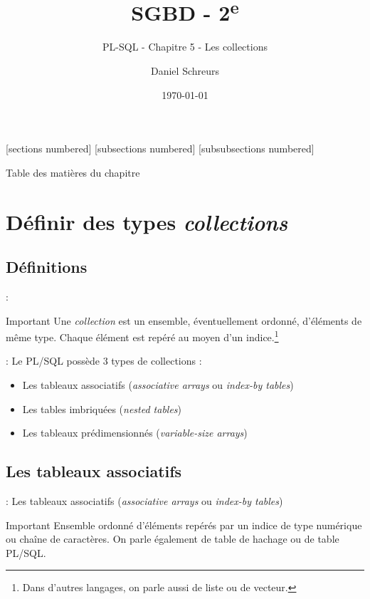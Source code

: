 \documentclass[10pt]{beamer}
\title{SGBD - 2\textsuperscript{e}}
\subtitle{PL-SQL - Chapitre 5 - Les collections}
\date{\today}
\author{Daniel Schreurs}
\institute{Haute École de la Province de Liège}
\begin{document}
\maketitle

[sections numbered]
[subsections numbered]
[subsubsections numbered]
\begin{frame}[allowframebreaks]{Table des matières du chapitre}
    \tableofcontents[subsectionstyle=show/show/hide,subsubsectionstyle=show/show/hide,]
\end{frame}

\section{Définir des types \textit{collections}}
\tocss
\subsection{Définitions}
\begin{frame}{\secname : \subsecname}
    \begin{alertblock}{Important}
        Une \emph{collection} est un ensemble, éventuellement ordonné, d'éléments de même type.
        Chaque élément est repéré au moyen d'un indice.\footnote{Dans d'autres langages, on parle aussi de liste ou de vecteur.}
    \end{alertblock}
\end{frame}

\begin{frame}{\secname : \subsecname}
    Le PL/SQL possède 3 types de collections :
    \begin{itemize}
        \item Les tableaux associatifs (\emph{associative arrays} ou \emph{index-by tables})
        \item Les tables imbriquées (\emph{nested tables})
        \item Les tableaux prédimensionnés (\emph{variable-size arrays})
    \end{itemize}
\end{frame}
\subsection{Les tableaux associatifs}
\begin{frame}{\secname : \subsecname}
    Les tableaux associatifs (\emph{associative arrays} ou \emph{index-by tables})
    \begin{alertblock}{Important}
        Ensemble ordonné d'éléments repérés par un indice de type numérique ou chaîne de caractères. On parle également de table de hachage ou de table PL/SQL.
    \end{alertblock}
\end{frame}
\end{document}
